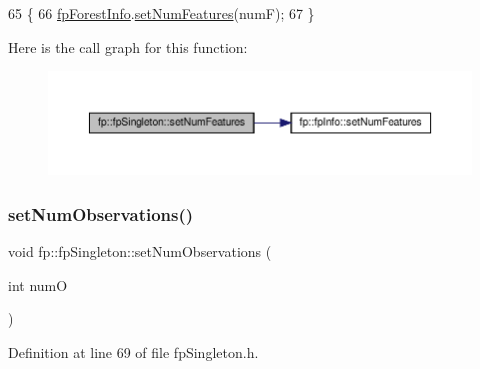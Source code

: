 \begin{DoxyCode}
65                                                 \{
66                 \hyperlink{classfp_1_1fpSingleton_a85965009befa72a749ae498fa5b6ccfa}{fpForestInfo}.\hyperlink{classfp_1_1fpInfo_ab8b97144a2a9ebd565d81de4b63f490c}{setNumFeatures}(numF);
67             \}
\end{DoxyCode}
Here is the call graph for this function\+:
\nopagebreak
\begin{figure}[H]
\begin{center}
\leavevmode
\includegraphics[width=350pt]{classfp_1_1fpSingleton_a5a35867349f6d172f77af7026fdaecbe_cgraph}
\end{center}
\end{figure}
\mbox{\label{classfp_1_1fpSingleton_acf821a8fda9d3296cde7dc33b9c1ddb5}} 
\subsubsection{\texorpdfstring{set\+Num\+Observations()}{setNumObservations()}}
{\footnotesize\ttfamily void fp\+::fp\+Singleton\+::set\+Num\+Observations (\begin{DoxyParamCaption}\item[{int}]{numO }\end{DoxyParamCaption})\hspace{0.3cm}{\ttfamily [inline]}}



Definition at line 69 of file fp\+Singleton.\+h.


